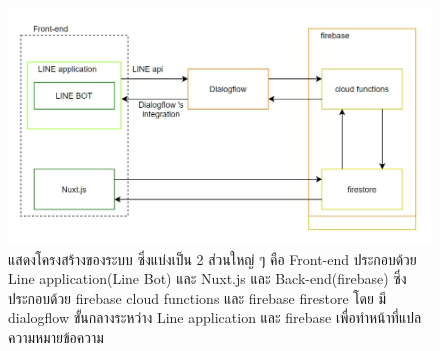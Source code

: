 \begin{figure}
\begin{center}
\includegraphics[width=14cm,keepaspectratio]{./images/structure.jpg}
\end{center}
\caption[Poem]{
  แสดงโครงสร้างของระบบ ซึ่งแบ่งเป็น 2 ส่วนใหญ่ ๆ คือ 
  Front-end ประกอบด้วย Line application(Line Bot) และ Nuxt.js 
  และ Back-end(firebase) ซึ่งประกอบด้วย firebase cloud functions และ firebase firestore 
  โดย มี dialogflow ขั้นกลางระหว่าง Line application และ firebase เพื่อทำหน้าที่แปลความหมายข้อความ
}
\end{figure}
